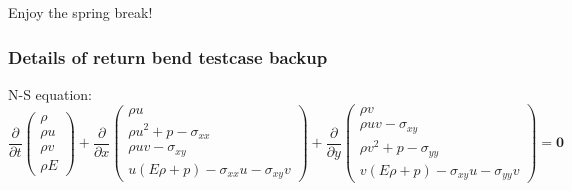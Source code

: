 \documentclass{beamer}
\begin{document}
\setcounter{framenumber}{46}
\begin{frame}
    \begin{center}
       Enjoy the spring break! 
    \end{center}
\end{frame}


\begin{frame}
    \frametitle{Details of return bend testcase \hfill \scriptsize{backup}}\scriptsize
    N-S equation:
    \begin{equation*}
        \frac{\partial}{\partial t}
        \begin{pmatrix}
            \rho \\ \rho u \\ \rho v\\ \rho E
        \end{pmatrix}
        + \frac{\partial}{\partial x} 
        \begin{pmatrix}
            \rho u\\
            \rho u^2 + p - \sigma_{xx}\\
            \rho uv - \sigma_{xy}\\
            u(E\rho+p) - \sigma_{xx} u - \sigma_{xy} v
        \end{pmatrix}
        + \frac{\partial}{\partial y}
        \begin{pmatrix}
            \rho v\\
            \rho uv-\sigma_{xy}\\
            \rho v^2+p-\sigma_{yy}\\
            v(E\rho+p) - \sigma_{xy} u -\sigma_{yy}v
        \end{pmatrix} 
        = \boldsymbol{0}
        \label{NSeqn}
    \end{equation*}


\end{frame}
\end{document}
